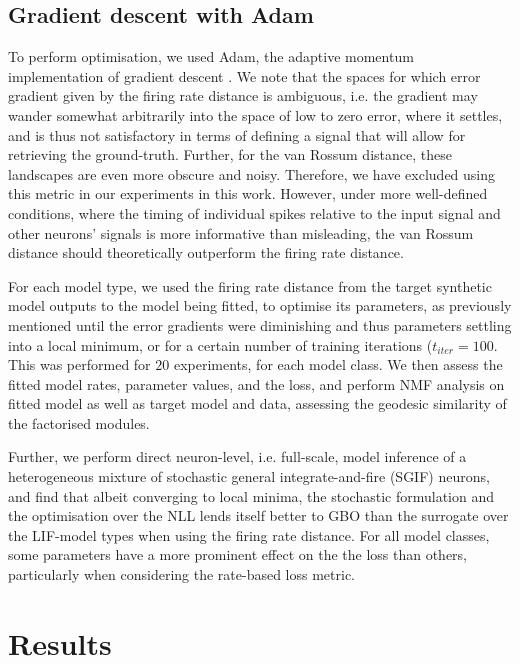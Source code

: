 \documentclass[mphil,deptreport,ianc]{infthesis} %
\begin{document}
\subsection{Gradient descent with Adam}

To perform optimisation, we used Adam, the adaptive momentum implementation of gradient descent \cite{Kingma2015}.
We note that the spaces for which error gradient given by the firing rate distance is ambiguous, i.e. the gradient may wander somewhat arbitrarily into the space of low to zero error, where it settles, and is thus not satisfactory in terms of defining a signal that will allow for retrieving the ground-truth.
Further, for the van Rossum distance, these landscapes are even more obscure and noisy. Therefore, we have excluded using this metric in our experiments in this work.
However, under more well-defined conditions, where the timing of individual spikes relative to the input signal and other neurons' signals is more informative than misleading, the van Rossum distance should theoretically outperform the firing rate distance.

For each model type, we used the firing rate distance from the target synthetic model outputs to the model being fitted, to optimise its parameters, as previously mentioned until the error gradients were diminishing and thus parameters settling into a local minimum, or for a certain number of training iterations ($t_{iter}=100$.
This was performed for $20$ experiments, for each model class. We then assess the fitted model rates, parameter values, and the loss, and perform NMF analysis on fitted model as well as target model and data, assessing the geodesic similarity of the factorised modules.

Further, we perform direct neuron-level, i.e. full-scale, model inference of a heterogeneous mixture of stochastic general integrate-and-fire (SGIF) neurons, and find that albeit converging to local minima, the stochastic formulation and the optimisation over the NLL lends itself better to GBO than the surrogate over the LIF-model types when using the firing rate distance.
For all model classes, some parameters have a more prominent effect on the the loss than others, particularly when considering the rate-based loss metric. 


\section{Results}
\end{document}

